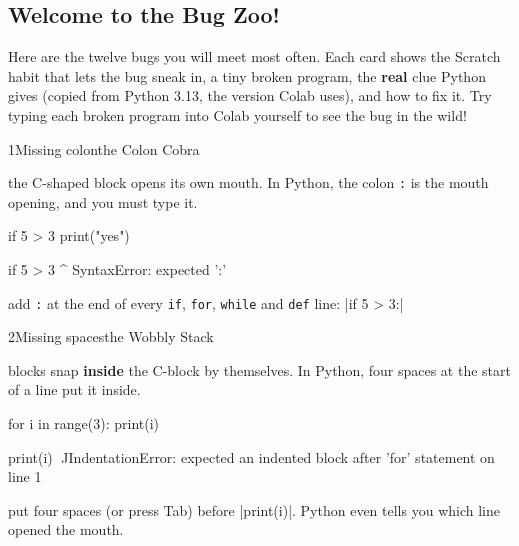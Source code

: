\subsection*{Welcome to the Bug Zoo!}

Here are the twelve bugs you will meet most often. Each card shows the Scratch habit that lets the bug sneak in, a tiny broken program, the \textbf{real} clue Python gives (copied from Python 3.13, the version Colab uses), and how to fix it. Try typing each broken program into Colab yourself to see the bug in the wild!

\begin{bzcard}{1}{Missing colon}{the Colon Cobra}
\noindent\begin{minipage}[c]{0.43\linewidth}
 the C-shaped  block opens its own mouth. In Python, the colon \texttt{:} is the mouth opening, and you must type it.
\end{minipage}\hfill
\begin{minipage}[c]{0.54\linewidth}
\begin{bzsnip}
if 5 > 3
    print("yes")
\end{bzsnip}
\end{minipage}\par
\begin{bzerror}
    if 5 > 3
            ^
SyntaxError: expected ':'
\end{bzerror}
 add \texttt{:} at the end of every \texttt{if}, \texttt{for}, \texttt{while} and \texttt{def} line: \py|if 5 > 3:|
\end{bzcard}

\begin{bzcard}{2}{Missing spaces}{the Wobbly Stack}
\noindent\begin{minipage}[c]{0.43\linewidth}
 blocks snap \textbf{inside} the C-block by themselves. In Python, four spaces at the start of a line put it inside.
\end{minipage}\hfill
\begin{minipage}[c]{0.54\linewidth}
\begin{bzsnip}
for i in range(3):
print(i)
\end{bzsnip}
\end{minipage}\par
\begin{bzerrorsmall}
    print(i)
    ^^^^^
IndentationError: expected an indented block after 'for' statement on line 1
\end{bzerrorsmall}
 put four spaces (or press Tab) before \py|print(i)|. Python even tells you which line opened the mouth.
\end{bzcard}

